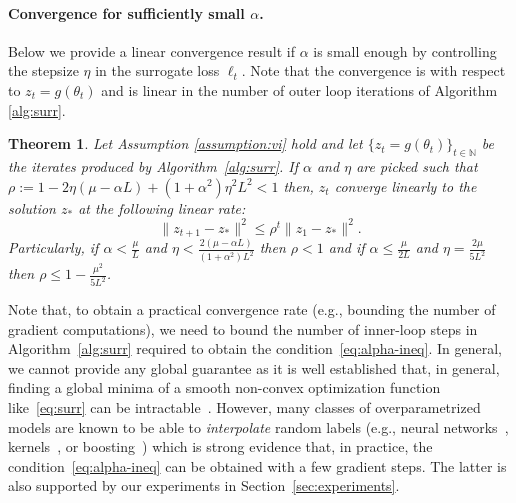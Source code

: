 \documentclass{article} %
\newtheorem{theorem}{Theorem}[section]
\theoremstyle{definition}
\newcommand{\nnumbers}{\mathbb{N}}
\begin{document}
\paragraph{Convergence for sufficiently small $\alpha$.} Below we provide a linear convergence result if $\alpha$ is small enough by controlling the stepsize $\eta$ in the surrogate loss $\ell_t$.
Note that the convergence is with respect to $z_t = g(\theta_t)$ and is linear in the number of outer loop iterations of Algorithm \ref{alg:surr}.
\begin{theorem}\label{thm:det}
    Let Assumption \ref{assumption:vi} hold and let $\{z_t = g(\theta_t)\}_{t\in \nnumbers}$ be  the iterates produced by Algorithm~\ref{alg:surr}. If $\alpha$ and $\eta$ are picked  such that
$
\rho:= 1-2\eta(\mu-\alpha L) + (1+\alpha^2)\eta^2 L^2 <1 
$ then, $z_t$ converge linearly to the solution $z_\ast$ at the following linear rate:
\begin{equation}
    \|z_{t+1} -z_*\|^2 \leq \rho^t \|z_1-z_*\|^2.
\end{equation}Particularly, if $\alpha< \frac{\mu}{L}$ and $\eta < \frac{2 (\mu-\alpha L)}{(1+\alpha^2)L^2}$ then $\rho <1$ and if
$\alpha \leq \frac{\mu}{2L}$ and $\eta = \frac{2\mu}{5L^2}$ then $\rho \leq 1 - \frac{\mu^2}{5L^2}$.
\end{theorem}

Note that, to obtain a practical convergence rate (e.g., bounding the number of gradient computations), we need to bound the number of inner-loop steps in Algorithm~\ref{alg:surr} required to obtain the condition~\eqref{eq:alpha-ineq}. In general, we cannot provide any global guarantee as it is well established that, in general, finding a global minima of a smooth non-convex optimization function like~\eqref{eq:surr} can be intractable~\citep{murty1985some,nemirovskij1983problem}. However, many classes of overparametrized models are known to be able to \emph{interpolate} random labels (e.g., neural networks~\citep{zhang2017understanding}, kernels~\citep{belkin2019does}, or boosting~\citep{bartlett1998boosting}) which is strong evidence that, in practice, the condition~\eqref{eq:alpha-ineq} can be obtained with a few gradient steps. The latter is also supported by our experiments in Section~\ref{sec:experiments}.
\vspace{-1em}
\end{document}
